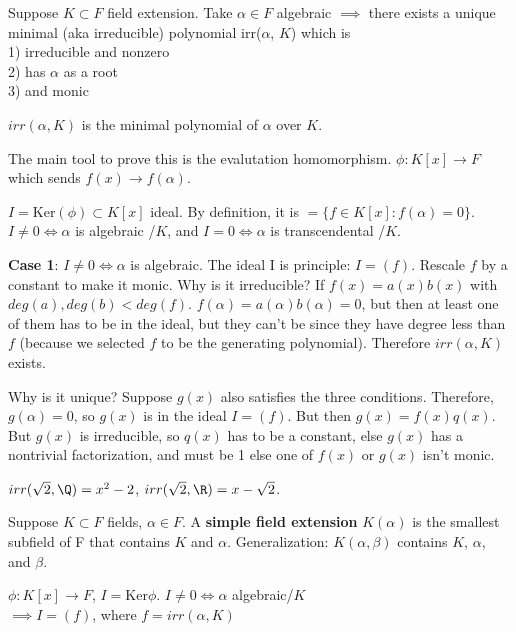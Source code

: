 \documentclass[twoside, 10pt]{article}
\newcommand{\Ker}{\text{Ker}}
\begin{document}
\begin{lem}
    Suppose $K \subset F$ field extension. Take $\alpha \in F$ algebraic $\implies$ there exists a unique minimal (aka irreducible) polynomial irr($\alpha$, $K$) which is \\
    1) irreducible and nonzero \\
    2) has $\alpha$ as a root \\
    3) and monic 
\end{lem}
$irr(\alpha, K)$ is the minimal polynomial of $\alpha$ over $K$.

The main tool to prove this is the evalutation homomorphism. $\phi: K[x] \to F$ which sends $f(x) \to f(\alpha)$.

$I = \Ker(\phi) \subset K[x]$ ideal. By definition, it is $= \{ f\in K[x] : f(\alpha) = 0\}$. $I \neq 0 \iff \alpha$ is algebraic /$K$, and $I = 0 \iff \alpha$ is transcendental /$K$.

\textbf{Case 1}: $I \neq 0 \iff \alpha$ is algebraic.
The ideal I is principle: $I = (f)$. Rescale $f$ by a constant to make it monic. Why is it irreducible? If $f(x) = a(x)b(x)$ with $deg (a), deg(b) < deg(f)$. $f(\alpha) = a(\alpha)b(\alpha) = 0$, but then at least one of them has to be in the ideal, but they can't be since they have degree less than $f$ (because we selected $f$ to be the generating polynomial). Therefore $irr(\alpha, K)$ exists.

Why is it unique? Suppose $g(x)$ also satisfies the three conditions. Therefore, $g(\alpha) = 0$, so $g(x)$ is in the ideal $I = (f)$. But then $g(x) = f(x)q(x)$. But $g(x)$ is irreducible, so $q(x)$ has to be a constant, else $g(x)$ has a nontrivial factorization, and must be 1 else one of $f(x)$ or $g(x)$ isn't monic.

\begin{exm*}
    $irr(\sqrt{2}, \Q) = x^2 - 2$, $irr(\sqrt{2}, \R) = x - \sqrt2$.
\end{exm*}

\begin{defn}
    Suppose $K \subset F$ fields, $\alpha \in F$. A \textbf{simple field extension} $K(\alpha)$ is the smallest subfield of F that contains $K$ and $\alpha$. Generalization: $K(\alpha, \beta)$ contains $K$, $\alpha$, and $\beta$.
\end{defn}

$\phi : K[x] \to F$, $I = \Ker\phi$. $I \neq 0 \iff \alpha$ algebraic/$K$\\
$\implies I = (f)$, where $f = irr(\alpha, K)$
\end{document}
